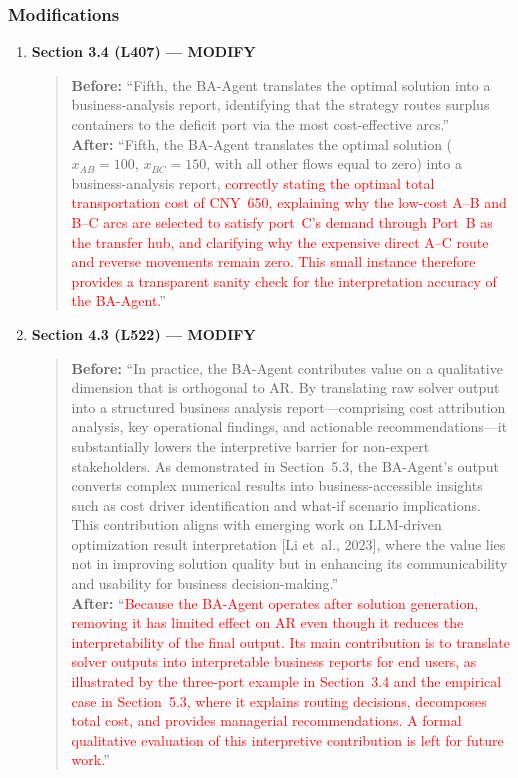 \documentclass[11pt,a4paper]{article}
\begin{document}
\subsubsection{Modifications}
\begin{enumerate}
\item \textbf{Section 3.4 (L407) --- MODIFY}
\begin{quote}
\textbf{Before:} ``Fifth, the BA-Agent translates the optimal solution into a business-analysis report, identifying that the strategy routes surplus containers to the deficit port via the most cost-effective arcs.''\\[4pt]
\textbf{After:} ``Fifth, the BA-Agent translates the optimal solution ($x_{AB}{=}100$, $x_{BC}{=}150$, with all other flows equal to zero) into a business-analysis report, \textcolor{red}{correctly stating the optimal total transportation cost of CNY~650, explaining why the low-cost A--B and B--C arcs are selected to satisfy port~C's demand through Port~B as the transfer hub, and clarifying why the expensive direct A--C route and reverse movements remain zero. This small instance therefore provides a transparent sanity check for the interpretation accuracy of the BA-Agent.}''
\end{quote}

\item \textbf{Section 4.3 (L522) --- MODIFY}
\begin{quote}
\textbf{Before:} ``In practice, the BA-Agent contributes value on a qualitative dimension that is orthogonal to AR. By translating raw solver output into a structured business analysis report---comprising cost attribution analysis, key operational findings, and actionable recommendations---it substantially lowers the interpretive barrier for non-expert stakeholders. As demonstrated in Section~5.3, the BA-Agent's output converts complex numerical results into business-accessible insights such as cost driver identification and what-if scenario implications. This contribution aligns with emerging work on LLM-driven optimization result interpretation [Li et~al., 2023], where the value lies not in improving solution quality but in enhancing its communicability and usability for business decision-making.''\\[4pt]
\textbf{After:} ``\textcolor{red}{Because the BA-Agent operates after solution generation, removing it has limited effect on AR even though it reduces the interpretability of the final output. Its main contribution is to translate solver outputs into interpretable business reports for end users, as illustrated by the three-port example in Section~3.4 and the empirical case in Section~5.3, where it explains routing decisions, decomposes total cost, and provides managerial recommendations. A formal qualitative evaluation of this interpretive contribution is left for future work.}''
\end{quote}


\end{enumerate}
\end{document}
